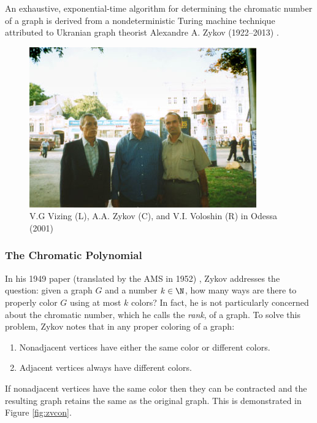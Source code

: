 An exhaustive, exponential-time algorithm for determining the chromatic number of a graph is derived from a
nondeterministic Turing machine technique attributed to Ukranian graph theorist Alexandre A. Zykov (1922--2013)
\cite{obit}.

\begin{figure}[h]
  \label{fig:zykov}
  \begin{center}
    \includegraphics{zykov}
  \end{center}
  \caption{V.G Vizing (L), A.A. Zykov (C), and V.I. Voloshin (R) in Odessa (2001) \cite{voloshin}}
\end{figure}

\subsubsection{The Chromatic Polynomial}

In his 1949 paper (translated by the AMS in 1952) \cite{zykov}, Zykov addresses the question: given a graph \(G\) and
a number \(k\in\N\), how many ways are there to properly color \(G\) using at most \(k\) colors?  In fact, he is not
particularly concerned about the chromatic number, which he calls the \emph{rank}, of a graph.  To solve this problem,
Zykov notes that in any proper coloring of a graph:
\begin{enumerate}
\item Nonadjacent vertices have either the same color or different colors.
\item Adjacent vertices always have different colors.
\end{enumerate}
If nonadjacent vertices have the same color then they can be contracted and the resulting graph retains the same
 as the original graph.  This is demonstrated in Figure \ref{fig:zvcon}.

